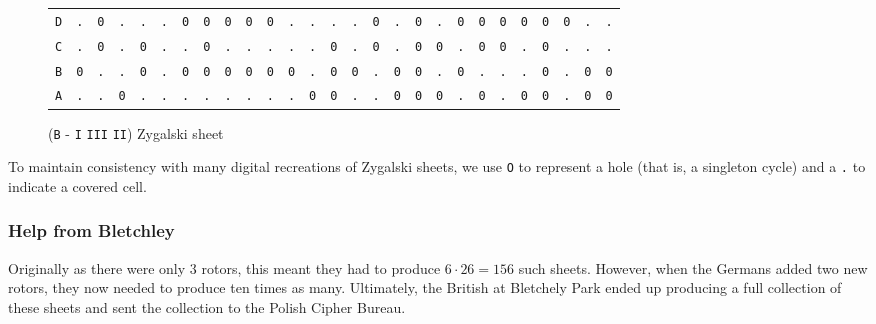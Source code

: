 \begin{figure}[H]
\begin{center}
{\begin{tabular}{c|cccccccccccccccccccccccccc}
				\texttt{D} & \texttt{.} & \texttt{0} & \texttt{.} &
				\texttt{.} & \texttt{.} & \texttt{0} & \texttt{0} &
				\texttt{0} & \texttt{0} & \texttt{0} & \texttt{.} &
				\texttt{.} & \texttt{.} & \texttt{.} & \texttt{0} &
				\texttt{.} & \texttt{0} & \texttt{.} & \texttt{0} &
				\texttt{0} & \texttt{0} & \texttt{0} & \texttt{0} &
				\texttt{0} & \texttt{.} & \texttt{.}                             \\
				\texttt{C} & \texttt{.} & \texttt{0} & \texttt{.} &
				\texttt{0} & \texttt{.} & \texttt{.} & \texttt{0} &
				\texttt{.} & \texttt{.} & \texttt{.} & \texttt{.} &
				\texttt{.} & \texttt{0} & \texttt{.} & \texttt{0} &
				\texttt{.} & \texttt{0} & \texttt{0} & \texttt{.} &
				\texttt{0} & \texttt{0} & \texttt{.} & \texttt{0} &
				\texttt{.} & \texttt{.} & \texttt{.}                             \\
				\texttt{B} & \texttt{0} & \texttt{.} & \texttt{.} &
				\texttt{0} & \texttt{.} & \texttt{0} & \texttt{0} &
				\texttt{0} & \texttt{0} & \texttt{0} & \texttt{0} &
				\texttt{.} & \texttt{0} & \texttt{0} & \texttt{.} &
				\texttt{0} & \texttt{0} & \texttt{.} & \texttt{0} &
				\texttt{.} & \texttt{.} & \texttt{.} & \texttt{0} &
				\texttt{.} & \texttt{0} & \texttt{0}                             \\
				\texttt{A} & \texttt{.} & \texttt{.} & \texttt{0} &
				\texttt{.} & \texttt{.} & \texttt{.} & \texttt{.} &
				\texttt{.} & \texttt{.} & \texttt{.} & \texttt{.} &
				\texttt{0} & \texttt{0} & \texttt{.} & \texttt{.} &
				\texttt{0} & \texttt{0} & \texttt{0} & \texttt{.} &
				\texttt{0} & \texttt{.} & \texttt{0} & \texttt{0} &
				\texttt{.} & \texttt{0} & \texttt{0}                             \\
			\end{tabular}}
	\end{center}
	\caption{(\texttt{B} - \texttt{I} \texttt{III} \texttt{II}) Zygalski sheet}
	\label{fig:zygalski_sheet}
\end{figure}
\noindent To maintain consistency with many digital recreations of
Zygalski sheets, we use \texttt{O} to represent a hole (that is, a
singleton cycle) and a \texttt{.} to indicate a covered cell.
\subsubsection{Help from Bletchley}
Originally as there were only $3$ rotors, this meant they had to
produce $6\cdot 26 = 156$ such sheets. However, when the Germans
added two new rotors, they now needed to produce ten times as many.
Ultimately, the British at Bletchely Park ended up producing a full
collection of these sheets and sent the collection to the Polish Cipher Bureau.

